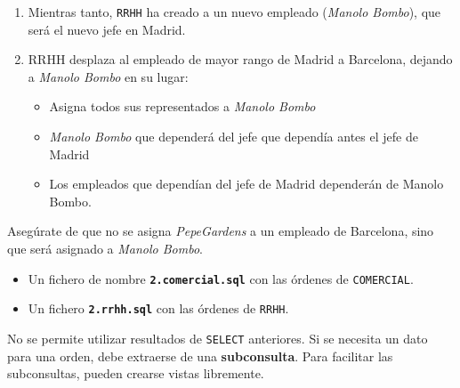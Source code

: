 \begin{homeworkProblem}

  {

    \begin{enumerate}
    \item Mientras tanto, \texttt{RRHH} ha creado a un nuevo empleado (\textit{Manolo Bombo}), que será el nuevo jefe en Madrid.
    \item RRHH desplaza al empleado de mayor rango de Madrid a Barcelona, dejando a \textit{Manolo Bombo} en su lugar:
      \begin{itemize}
      \item Asigna todos sus representados a \textit{Manolo Bombo}
      \item \textit{Manolo Bombo} que dependerá del jefe que dependía antes el jefe de Madrid
      \item Los empleados que dependían del jefe de Madrid dependerán de Manolo Bombo.
      \end{itemize}
    \end{enumerate}
  }
  Asegúrate de que no se asigna \textit{PepeGardens} a un empleado de Barcelona, sino que será asignado a \textit{Manolo Bombo}.

  \begin{Aviso}
    \begin{itemize}
    \item Un fichero de nombre \textbf{\texttt{2.comercial.sql}} con las órdenes de \texttt{COMERCIAL}.
    \item Un fichero \textbf{\texttt{2.rrhh.sql}} con las órdenes de \texttt{RRHH}.
    \end{itemize}

    
    No se permite utilizar resultados de \texttt{SELECT} anteriores. Si se necesita un dato para una orden, debe extraerse de una \textbf{subconsulta}. Para facilitar las subconsultas, pueden crearse vistas libremente.
  \end{Aviso}

\end{homeworkProblem}


